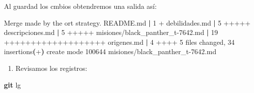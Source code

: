 \documentclass[
]{book}
\newenvironment{Shaded}{\begin{snugshade}}{\end{snugshade}}
\newcommand{\ErrorTok}[1]{\textcolor[rgb]{0.64,0.00,0.00}{\textbf{#1}}}
\newcommand{\ExtensionTok}[1]{#1}
\newcommand{\FunctionTok}[1]{\textcolor[rgb]{0.13,0.29,0.53}{\textbf{#1}}}
\newcommand{\KeywordTok}[1]{\textcolor[rgb]{0.13,0.29,0.53}{\textbf{#1}}}
\newcommand{\NormalTok}[1]{#1}
\newcommand{\StringTok}[1]{\textcolor[rgb]{0.31,0.60,0.02}{#1}}
\providecommand{\tightlist}{%
  \setlength{\itemsep}{0pt}\setlength{\parskip}{0pt}}
\begin{document}
Al guardad los cmbios obtendremos una salida así:

\begin{Shaded}
\begin{Highlighting}[]
\ExtensionTok{Merge}\NormalTok{ made by the }\StringTok{\textquotesingle{}ort\textquotesingle{}}\NormalTok{ strategy.}
 \ExtensionTok{README.md}                        \KeywordTok{|}  \ExtensionTok{1}\NormalTok{ +}
 \ExtensionTok{debilidades.md}                   \KeywordTok{|}  \ExtensionTok{5}\NormalTok{ +++++}
 \ExtensionTok{descripciones.md}                 \KeywordTok{|}  \ExtensionTok{5}\NormalTok{ +++++}
 \ExtensionTok{misiones/black\_panther\_t{-}7642.md} \KeywordTok{|} \ExtensionTok{19}\NormalTok{ +++++++++++++++++++}
 \ExtensionTok{origenes.md}                      \KeywordTok{|}  \ExtensionTok{4}\NormalTok{ ++++}
 \ExtensionTok{5}\NormalTok{ files changed, 34 insertions}\ErrorTok{(}\ExtensionTok{+}\KeywordTok{)}
 \ExtensionTok{create}\NormalTok{ mode 100644 misiones/black\_panther\_t{-}7642.md}
\end{Highlighting}
\end{Shaded}

\begin{enumerate}
\def\labelenumi{\arabic{enumi}.}
\setcounter{enumi}{7}
\tightlist
\item
  Revisamos los registros:
\end{enumerate}

\begin{Shaded}
\begin{Highlighting}[]
\FunctionTok{git}\NormalTok{ lg}
\end{Highlighting}
\end{Shaded}
\end{document}
